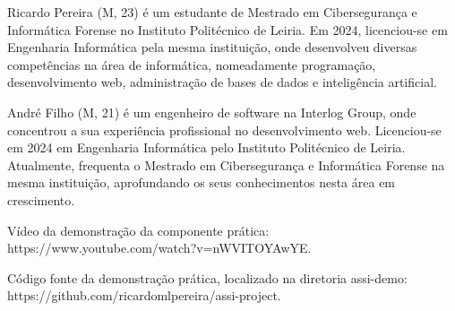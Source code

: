 \documentclass[journal]{IEEEtran}
\begin{document}
\begin{IEEEbiography}{Ricardo Pereira}
  (M, 23) é um estudante de Mestrado em Cibersegurança e Informática Forense no Instituto Politécnico de Leiria. Em 2024, licenciou-se em Engenharia Informática pela mesma instituição, onde desenvolveu diversas competências na área de informática, nomeadamente programação, desenvolvimento web, administração de bases de dados e inteligência artificial.
\end{IEEEbiography}


\begin{IEEEbiography}{André Filho}
  (M, 21) é um engenheiro de software na Interlog Group, onde concentrou a sua experiência profissional no desenvolvimento web. Licenciou-se em 2024 em Engenharia Informática pelo Instituto Politécnico de Leiria. Atualmente, frequenta o Mestrado em Cibersegurança e Informática Forense na mesma instituição, aprofundando os seus conhecimentos nesta área em crescimento.
\end{IEEEbiography}

\vfill

Vídeo da demonstração da componente prática: https://www.youtube.com/watch?v=nWVITOYAwYE.


Código fonte da demonstração prática, localizado na diretoria assi-demo: https://github.com/ricardomlpereira/assi-project.




\end{document}
